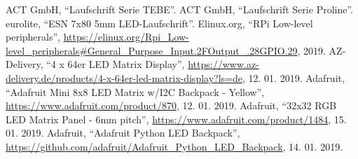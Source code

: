 \documentclass[conference]{IEEEtran}
\begin{document}
\begin{thebibliography}{00}
  ACT GmbH,
  ``Laufschrift Serie TEBE''.
  ACT GmbH,
  ``Laufschrift Serie Proline''.
  eurolite,
  ``ESN 7x80 5mm LED-Laufschrift''.
  Elinux.org,
  ``RPi Low-level peripherals'',
  \url{https://elinux.org/Rpi_Low-level_peripherals#General_Purpose_Input.2FOutput_.28GPIO.29},
  2019.
  AZ-Delivery,
  ``4 x 64er LED Matrix Display'',
  \url{https://www.az-delivery.de/products/4-x-64er-led-matrix-display?ls=de},
  12. 01. 2019.
  Adafruit,
  ``Adafruit Mini 8x8 LED Matrix w/I2C Backpack - Yellow'',
  \url{https://www.adafruit.com/product/870},
  12. 01. 2019.
  Adafruit,
  ``32x32 RGB LED Matrix Panel - 6mm pitch'',
  \url{https://www.adafruit.com/product/1484},
  15. 01. 2019.
  Adafruit,
  ``Adafruit Python LED Backpack'',
  \url{https://github.com/adafruit/Adafruit_Python_LED_Backpack},
  14. 01. 2019.
\end{thebibliography}
\end{document}
